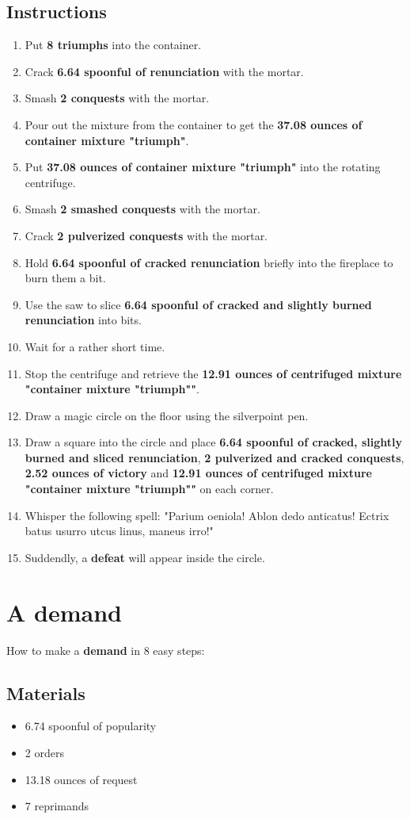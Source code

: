 \documentclass{article}
\begin{document}
\subsection{Instructions}\begin{enumerate}
\item 
Put \textbf{8 triumphs} into the container.
\item 
Crack \textbf{6.64 spoonful of renunciation} with the mortar.
\item 
Smash \textbf{2 conquests} with the mortar.
\item 
Pour out the mixture from the container to get the \textbf{37.08 ounces of container mixture "triumph"}.
\item 
Put \textbf{37.08 ounces of container mixture "triumph"} into the rotating centrifuge.
\item 
Smash \textbf{2 smashed conquests} with the mortar.
\item 
Crack \textbf{2 pulverized conquests} with the mortar.
\item 
Hold \textbf{6.64 spoonful of cracked renunciation} briefly into the fireplace to burn them a bit.
\item 
Use the saw to slice \textbf{6.64 spoonful of cracked and slightly burned renunciation} into bits.
\item 
Wait for a rather short time.
\item 
Stop the centrifuge and retrieve the \textbf{12.91 ounces of centrifuged mixture "container mixture "triumph""}.
\item 
Draw a magic circle on the floor using the silverpoint pen.
\item 
Draw a square into the circle and place \textbf{6.64 spoonful of cracked, slightly burned and sliced renunciation}, \textbf{2 pulverized and cracked conquests}, \textbf{2.52 ounces of victory} and \textbf{12.91 ounces of centrifuged mixture "container mixture "triumph""} on each corner.
\item 
Whisper the following spell: "Parium oeniola! Ablon dedo anticatus! Ectrix batus usurro utcus linus, maneus irro!"
\item 
Suddendly, a \textbf{defeat} will appear inside the circle.
\end{enumerate}
\newpage
\section{A demand}How to make a \textbf{demand} in 8 easy steps:

\subsection{Materials}\begin{itemize}
\item 
6.74 spoonful of popularity
\item 
2 orders
\item 
13.18 ounces of request
\item 
7 reprimands
\end{itemize}
\end{document}
